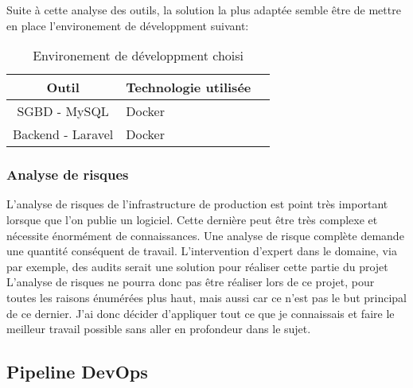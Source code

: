 \documentclass[
    iai, %
    il, %
]{heig-tb}
\begin{document}


Suite à cette analyse des outils, la solution la plus adaptée semble être de mettre en place l'environement de développment suivant:

\begin{table}[h]
    \begin{center}
        \caption{Environement de développment choisi \label{env_prod}}
        \begin{tabular}{c|l|r}
            Outil             & Technologie utilisée \\ \hline
            SGBD - MySQL      & Docker               \\
            Backend - Laravel & Docker               \\
        \end{tabular}
    \end{center}
\end{table}

\subsubsection{Analyse de risques}

L'analyse de risques de l'infrastructure de production est point très important lorsque que l'on publie un logiciel. Cette dernière peut être très complexe et nécessite énormément de connaissances.
Une analyse de risque complète demande une quantité conséquent de travail. L'intervention d'expert dans le domaine, via par exemple, des audits serait une solution pour réaliser cette partie du projet
L'analyse de risques ne pourra donc pas être réaliser lors de ce projet, pour toutes les raisons énumérées plus haut, mais aussi car ce n'est pas le but principal de ce dernier.
J'ai donc décider d'appliquer tout ce que je connaissais et faire le meilleur travail possible sans aller en profondeur dans le sujet.


\clearpage
\subsection{Pipeline DevOps}
\end{document}
